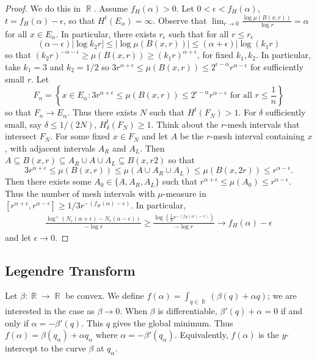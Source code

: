 \documentclass[11pt, a4paper]{memoir}
\DeclareMathOperator{\R}{{\mathbb{R}}}
\theoremstyle{change}
\theoremstyle{plain}
\theoremstyle{nonumberplain}
\newtheorem{proof}{Proof}
\numberwithin{equation}{section}
\begin{document}
\begin{proof}
    We do this in $\R$.
    Assume $f_H(\alpha)>0$.
    Let $0<\epsilon<f_H(\alpha)$, $t=f_H(\alpha)-\epsilon$, so that $H^t(E_\alpha)=\infty$.
    Observe that $\lim_{r\to 0}\frac{\log\mu(B(x,r))}{\log r}=\alpha$ for all $x\in E_\alpha$.
    In particular, there exists $r_\epsilon$ such that for all $r\leq r_\epsilon$
    \begin{equation*}
        (\alpha-\epsilon)|\log k_2r|\leq |\log\mu(B(x,r))|\leq(\alpha+\epsilon)|\log(k_1r)
    \end{equation*}
    so that $(k_2r)^{-\alpha-\epsilon}\geq\mu(B(x,r))\geq(k_1r)^{\alpha+\epsilon}$, for fixed $k_1,k_2$.
    In particular, take $k_1=3$ and $k_2=1/2$ so $3r^{\alpha+\epsilon}\leq \mu(B(x,r))\leq 2^{\epsilon-\alpha}r^{\alpha-\epsilon}$ for sufficiently small $r$.
    Let
    \begin{equation*}
        F_n = \left\{x\in E_\alpha:3r^{\alpha+\epsilon}\leq \mu(B(x,r))\leq 2^{\epsilon-\alpha}r^{\alpha-\epsilon}\text{ for all }r\leq\frac{1}{n}\right\}
    \end{equation*}
    so that $F_n\to E_\alpha$.
    Thus there exists $N$ such that $H^t(F_N)>1$.
    For $\delta$ sufficiently small, say $\delta\leq 1/(2N)$, $H_\delta^t(F_N)\geq 1$.
    Think about the $r$-mesh intervals that intersect $F_N$.
    For some fixed $x\in F_N$ and let $A$ be the $r$-mesh interval containing $x$, with adjacent intervals $A_R$ and $A_L$.
    Then $A\subseteq B(x,r)\subseteq A_R\cup A\cup A_L\subseteq B(x,r2)$ so that
    \begin{equation*}
        3r^{\alpha+\epsilon}  \leq \mu(B(x,r))\leq \mu(A\cup A_R\cup A_L)\leq \mu(B(x,2r))\leq r^{\alpha-\epsilon}.
    \end{equation*}
    Then there exists some $A_0\in\{A,A_R,A_L\}$ such that $r^{\alpha+\epsilon}\leq\mu(A_0)\leq r^{\alpha-\epsilon}$.
    Thus the number of mesh intervals with $\mu$-measure in $[r^{\alpha+\epsilon},r^{\alpha-\epsilon}]\geq 1/3r^{-(f_H(\alpha)-\epsilon)}$.
    In particular,
    \begin{align*}
        \frac{\log^+(N_r(\alpha+\epsilon)-N_r(\alpha-\epsilon))}{-\log r}\geq\frac{\log(\frac{1}{3}r^{-(f_H(\alpha)-\epsilon)})}{-\log r}\to f_H(\alpha)-\epsilon
    \end{align*}
    and let $\epsilon\to 0$.
\end{proof}
\subsection{Legendre Transform}
Let $\beta:\R\to\R$ be convex.
We define $f(\alpha)=\int_{q\in\R}(\beta(q)+\alpha q)$; we are interested in the case as $\beta\to 0$.
When $\beta$ is differentiable, $\beta'(q)+\alpha=0$ if and only if $\alpha=-\beta'(q)$.
This $q$ gives the global minimum.
Thus $f(\alpha)=\beta(q_\alpha)+\alpha q_\alpha$ where $\alpha=-\beta'(q_\alpha)$.
Equivalently, $f(\alpha)$ is the $y$-intercept to the curve $\beta$ at $q_\alpha$.
\end{document}
